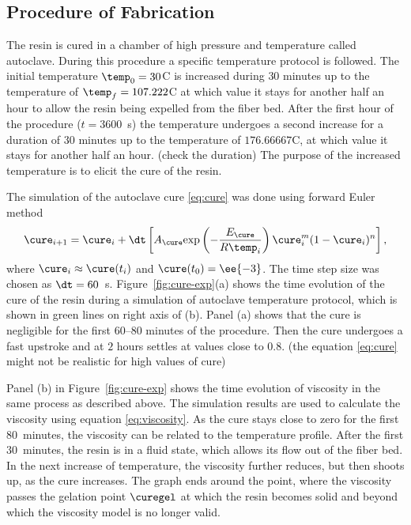 \documentclass[twoside,a4paper,12pt]{article}
\newcommand{\figref}[1]{Figure~\ref{#1}}
\newcommand{\note}[1]{{\color{red}(#1)}}
\newcommand{\note}[1]{}
\begin{document}
\subsection{Procedure of Fabrication}

The resin is cured in a chamber of high pressure and temperature
called autoclave. During this procedure a specific temperature
protocol is followed.  The initial temperature $\temp_0 = 30$\degree C is
increased during $30$ minutes up to the temperature of
$\temp_f = 107.222$\degree C at which value it stays for another half an
hour to allow the resin being expelled from the fiber bed. After the
first hour of the procedure ($t=3600$~s) the temperature undergoes a
second increase for a duration of $30$ minutes up to the temperature
of $176.66667$\degree C, at which value it stays for another half an
hour. \note{check the duration} The purpose of the increased
temperature is to elicit the cure of the resin.

The simulation of the autoclave cure \eqref{eq:cure} was done using
forward Euler method
%
\begin{align}
  \cure_{i+1} =    \cure_i + \dt \left[A_\cure \exp{-\frac{E_\cure }{R\temp_i}} \cure_i^m (1-\cure_i)^n\right], \label{eq:cure-fe}
\end{align}
%
where $\cure_i \approx \cure(t_i)$ and $\cure(t_0)=\ee{-3}$. The
time step size was chosen as $\dt = 60$~s.
%
\figref{fig:cure-exp}(a) shows the time evolution of the cure of the
resin during a simulation of autoclave temperature protocol, which is
shown in green lines on right axis of (b).  Panel (a) shows that the
cure is negligible for the first $60$--$80$ minutes of the
procedure. Then the cure undergoes a fast upstroke and at $2$ hours
settles at values close to $0.8$.
%
\note{the equation \eqref{eq:cure} might not be realistic for high values of cure}

Panel (b) in \figref{fig:cure-exp} shows the time evolution of
viscosity in the same process as described above. The simulation
results are used to calculate the viscosity using equation
\eqref{eq:viscosity}. As the cure stays close to zero for the first
$80$~minutes, the viscosity can be related to the temperature
profile. After the first $30$~minutes, the resin is in a fluid state,
which allows its flow out of the fiber bed. In the next increase of
temperature, the viscosity further reduces, but then shoots up, as the
cure increases. The graph ends around the point, where the viscosity
passes the gelation point $\curegel$ at which the resin becomes solid
and beyond which the viscosity model is no longer valid.
\end{document}
